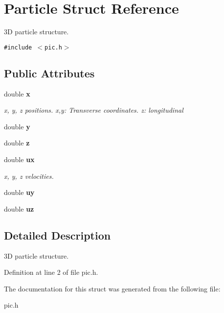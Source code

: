 \section{Particle Struct Reference}
\label{structParticle}
3D particle structure.  


{\tt \#include $<$pic.h$>$}

\subsection*{Public Attributes}
\begin{CompactItemize}
\item 
double {\bf x}\label{structParticle_1e3e5e103cee69ae9acb9c3269d009d7}

\begin{CompactList}\small\item\em x, y, z positions. x,y: Transverse coordinates. z: longitudinal \item\end{CompactList}\item 
double \textbf{y}\label{structParticle_434ab690dde4422ac74ae10f6ace7a52}

\item 
double \textbf{z}\label{structParticle_518399a50ebdd632b22d7f48e5958461}

\item 
double {\bf ux}\label{structParticle_61e44eaba00b1a96436986e0737e8724}

\begin{CompactList}\small\item\em x, y, z velocities. \item\end{CompactList}\item 
double \textbf{uy}\label{structParticle_3c67ede486b04af4d5f834072defa5c8}

\item 
double \textbf{uz}\label{structParticle_89a3f7cacc8bd0250855e8a07bebd645}

\end{CompactItemize}


\subsection{Detailed Description}
3D particle structure. 

Definition at line 2 of file pic.h.

The documentation for this struct was generated from the following file:\begin{CompactItemize}
\item 
pic.h\end{CompactItemize}
